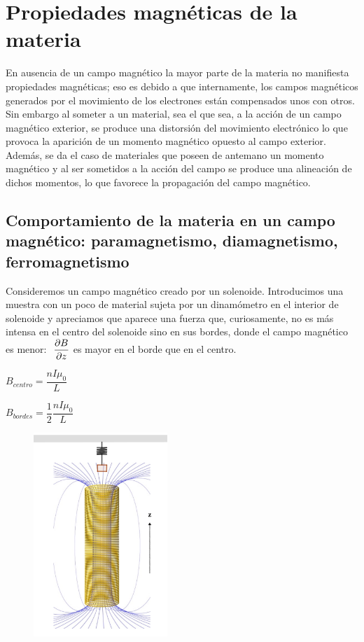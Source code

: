 \chapter{Propiedades magnéticas de la materia}

\begin{miparrafo}
	En ausencia de un campo magnético la mayor parte de la materia no manifiesta propiedades magnéticas; eso es debido a que internamente, los campos magnéticos generados por el movimiento de los electrones están compensados unos con otros. Sin embargo al someter a un material, sea el que sea, a la acción de un campo magnético exterior, se produce una distorsión del movimiento electrónico lo que provoca la aparición de un momento magnético opuesto al campo exterior. Además, se da el caso de materiales que poseen de antemano un momento magnético y al ser sometidos a la acción del campo se produce una alineación de dichos momentos, lo que favorece la propagación del campo magnético.
\end{miparrafo}


\section[Comportamiento de la materia en un campo magnético: paramagnetismo, diamagnetismo, ferromagnetismo]{Comportamiento de la materia en un campo magnético: paramagnetismo, diamagnetismo, ferromagnetismo}


\begin{multicols}{2}
Consideremos un campo magnético creado por un solenoide. Introducimos una muestra con un poco de material sujeta por un dinamómetro en el interior de solenoide y apreciamos que aparece una fuerza que, curiosamente, no es más intensa en el centro del solenoide sino en sus bordes, donde el campo magnético es menor:
$\ \displaystyle \pdv{B}{z}$ es mayor en el borde que en el centro.

$B_{centro}=\dfrac{nI\mu_0}{L}$ 

$B_{bordes}=\dfrac 1 2 \dfrac{nI\mu_0}{L}$
\begin{figure}[H]
	\centering
	\includegraphics[width=0.45\textwidth]{imagenes/imagenes28/T28IM01.png}
\end{figure}	
\end{multicols}

